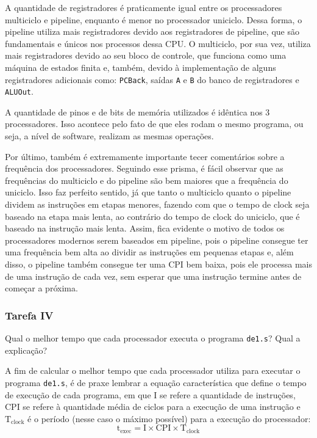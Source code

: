 \documentclass[a4paper,12pt]{article}
\newcommand{\cod}[1]{\texttt{#1}}
\begin{document}
A quantidade de registradores é praticamente igual entre os processadores multiciclo e pipeline, enquanto é menor no processador uniciclo. Dessa forma, o pipeline utiliza mais registradores devido aos registradores de pipeline, que são fundamentais e únicos nos processos dessa CPU. O multiciclo, por sua vez, utiliza mais registradores devido ao seu bloco de controle, que funciona como uma máquina de estados finita e, também, devido à implementação de alguns registradores adicionais como: \cod{PCBack}, saídas \cod{A} e \cod{B} do banco de registradores e \cod{ALUOut}.

A quantidade de pinos e de bits de memória utilizados é idêntica nos 3 processadores. Isso acontece pelo fato de que eles rodam o mesmo programa, ou seja, a nível de software, realizam as mesmas operações.

Por último, também é extremamente importante tecer comentários sobre a frequência dos processadores. Seguindo esse prisma, é fácil observar que as frequências do multiciclo e do pipeline são bem maiores que a frequência do uniciclo. Isso faz perfeito sentido, já que tanto o multiciclo quanto o pipeline dividem as instruções em etapas menores, fazendo com que o tempo de clock seja baseado na etapa mais lenta, ao contrário do tempo de clock do uniciclo, que é baseado na instrução mais lenta. Assim, fica evidente o motivo de todos os processadores modernos serem baseados em pipeline, pois o pipeline consegue ter uma frequência bem alta ao dividir as instruções em pequenas etapas e, além disso, o pipeline também consegue ter uma CPI bem baixa, pois ele processa mais de uma instrução de cada vez, sem esperar que uma instrução termine antes de começar a próxima.



\subsubsection{Tarefa IV}
\begin{tcolorbox}[title=Enunciado, colback=blue!5!white, colframe=blue!75!black]
    Qual o melhor tempo que cada processador executa o programa \cod{de1.s}? Qual a explicação? 
\end{tcolorbox}

A fim de calcular o melhor tempo que cada processador utiliza para executar o programa \cod{de1.s}, é de praxe lembrar a equação característica que define o tempo de execução de cada programa, em que $\mathrm{I}$ se refere a quantidade de instruções, CPI se refere à quantidade média de ciclos para a execução de uma instrução e $\mathrm{T}_{\mathrm{clock}}$ é o período (nesse caso o máximo possível) para a execução do processador:
\begin{equation*}
    \mathrm{t}_{\mathrm{exec}} = \mathrm{I} \times \mathrm{CPI} \times \mathrm{T}_{\mathrm{clock}}
\end{equation*}
\end{document}
